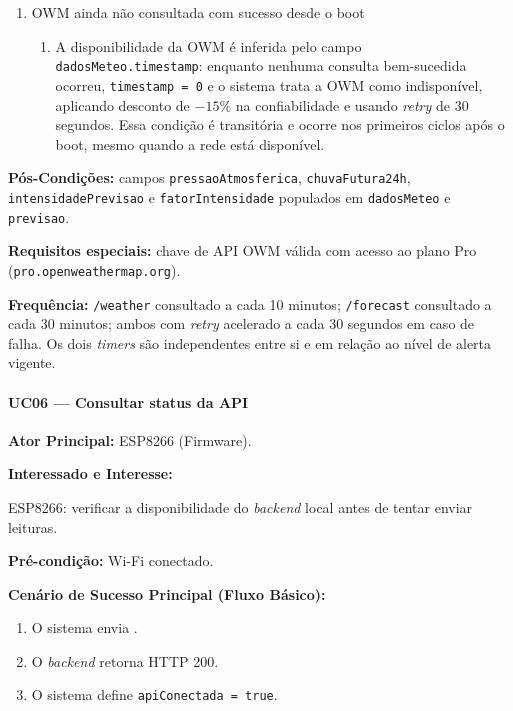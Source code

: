 \begin{enumerate}
  \renewcommand{\theenumi}{0a}
  \renewcommand{\labelenumi}{\theenumi.}
  \item OWM ainda não consultada com sucesso desde o boot
  \begin{enumerate}
  \item A disponibilidade da OWM é inferida pelo campo
        \texttt{dadosMeteo.timestamp}: enquanto nenhuma consulta
        bem-sucedida ocorreu, \texttt{timestamp = 0} e o sistema
        trata a OWM como indisponível, aplicando desconto de
        $-15\%$ na confiabilidade e usando \textit{retry} de 30
        segundos. Essa condição é transitória e ocorre nos
        primeiros ciclos após o boot, mesmo quando a rede está
        disponível.
  \end{enumerate}
\end{enumerate}

\textbf{Pós-Condições:} campos \texttt{pressaoAtmosferica},
\texttt{chuvaFutura24h}, \\ \texttt{intensidadePrevisao} e
\texttt{fatorIntensidade} populados em \texttt{dadosMeteo}
e \texttt{previsao}.

\textbf{Requisitos especiais:} chave de API OWM válida com
acesso ao plano Pro (\texttt{pro.openweathermap.org}).

\textbf{Frequência:} \texttt{/weather} consultado a cada 10 minutos;
\texttt{/forecast} consultado a cada 30 minutos; ambos com
\textit{retry} acelerado a cada 30 segundos em caso de falha.
Os dois \textit{timers} são independentes entre si e em relação
ao nível de alerta vigente.

\paragraph{UC06 --- Consultar status da API}\hfill\break

\textbf{Ator Principal:} ESP8266 (Firmware).

\textbf{Interessado e Interesse:}

ESP8266: verificar a disponibilidade do \textit{backend} local
antes de tentar enviar leituras.

\textbf{Pré-condição:} Wi-Fi conectado.

\textbf{Cenário de Sucesso Principal (Fluxo Básico):}
\begin{enumerate}
  \item O sistema envia
        .
  \item O \textit{backend} retorna HTTP 200.
  \item O sistema define \texttt{apiConectada = true}.
\end{enumerate}

